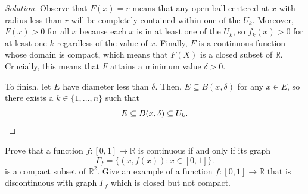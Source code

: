 \documentclass[11pt]{scrartcl}
\providecommand{\RR}{\mathbb R}
\newenvironment{soln}{\begin{proof}[Solution]}{\end{proof}}
\begin{document}
\begin{soln}
	Observe that $F(x) = r$ means that
	any open ball centered at $x$ with radius less than $r$
	will be completely contained within one of the $U_k$.
	Moreover, $F(x) > 0$ for all $x$ because each $x$
	is in at least one of the $U_k$, so $f_k(x) > 0$
	for at least one $k$ regardless of the value of $x$.
	Finally, $F$ is a continuous function
	whose domain is compact, which means that
	$F(X)$ is a closed subset of $\RR$.
	Crucially, this means that $F$ attains a minimum value $\delta > 0$.
	
	To finish, let $E$ have diameter less than $\delta$.
	Then, $E\subseteq B(x,\delta)$ for any $x\in E$,
	so there exists a $k\in\{1,\dots,n\}$ such that
	$$E\subseteq B(x,\delta)\subseteq U_k.\qedhere$$
\end{soln}

\begin{problem}
	Prove that a function $f\colon[0,1]\to\RR$ is continuous
	if and only if its graph
	\[\Gamma_f = \{(x, f(x)) : x\in[0,1]\}.\]
	is a compact subset of $\RR^2$.
	Give an example of a function $f\colon[0,1]\to\RR$
	that is discontinuous with graph $\Gamma_f$ which is
	closed but not compact.
\end{problem}
\end{document}
